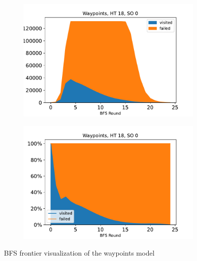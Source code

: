 \documentclass[
fancyheadings, %
%
%
]{stsreprt}
\begin{document}
\begin{figure}
    \begin{subfigure}[b]{.5\textwidth}
        \centering
        \includegraphics[width=\textwidth]{../evaluation/output-assets/EXP-11-bfs-frontiers-1.pdf}
        \label{fig:evaluation:EXP-11:1}
    \end{subfigure}
    \begin{subfigure}[b]{.5\textwidth}
        \centering
        \includegraphics[width=\textwidth]{../evaluation/output-assets/EXP-11-bfs-frontiers-5.pdf}
        \label{fig:evaluation:EXP-11:5}
    \end{subfigure}
    \caption{BFS frontier visualization of the waypoints model}
    \label{fig:evaluation:EXP-11-1}
\end{figure}
\end{document}
